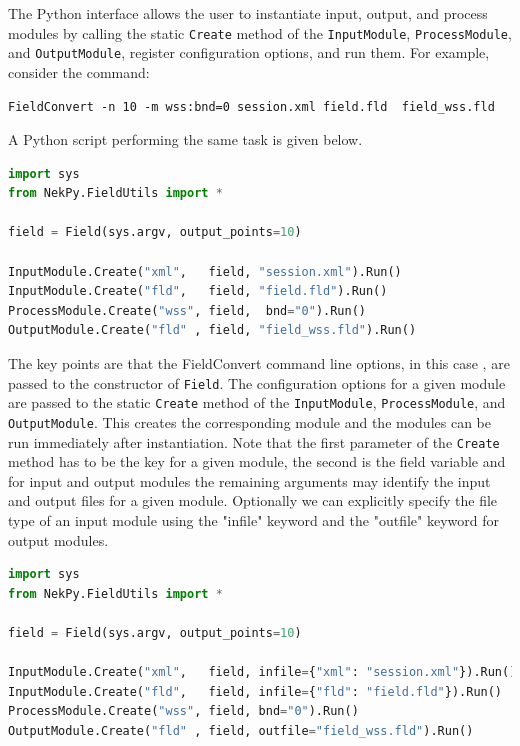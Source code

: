 The Python interface allows the user to instantiate input,
output, and process modules by calling the static \verb+Create+ method of the
\verb+InputModule+, \verb+ProcessModule+, and \verb+OutputModule+,
register configuration options, and run them.
For example, consider the command:

\begin{lstlisting}[style=BashInputStyle]
FieldConvert -n 10 -m wss:bnd=0 session.xml field.fld  field_wss.fld
\end{lstlisting}


A Python script performing the same task is given below.

\begin{lstlisting}[style=C++Style, language=Python]
import sys
from NekPy.FieldUtils import *

field = Field(sys.argv, output_points=10)

InputModule.Create("xml",   field, "session.xml").Run()
InputModule.Create("fld",   field, "field.fld").Run()
ProcessModule.Create("wss", field,  bnd="0").Run()
OutputModule.Create("fld" , field, "field_wss.fld").Run()
\end{lstlisting}

The key points are that the FieldConvert command line options, in this
case , are passed to the constructor of \verb+Field+.
The configuration options for a given module are passed to the static
\verb+Create+ method of the \verb+InputModule+, \verb+ProcessModule+, and
\verb+OutputModule+. This creates the corresponding module and the
modules can be run immediately after instantiation. Note that the first
parameter of the \verb+Create+ method has to be the key for a given module,
the second is the field variable and for input and output modules the remaining
arguments may identify the input and output files for a given module.
Optionally we can explicitly specify the file type of an input module
using the "infile" keyword and the "outfile" keyword for output modules.


\begin{lstlisting}[style=C++Style, language=Python]
import sys
from NekPy.FieldUtils import *

field = Field(sys.argv, output_points=10)

InputModule.Create("xml",   field, infile={"xml": "session.xml"}).Run()
InputModule.Create("fld",   field, infile={"fld": "field.fld"}).Run()
ProcessModule.Create("wss", field, bnd="0").Run()
OutputModule.Create("fld" , field, outfile="field_wss.fld").Run()
\end{lstlisting}

